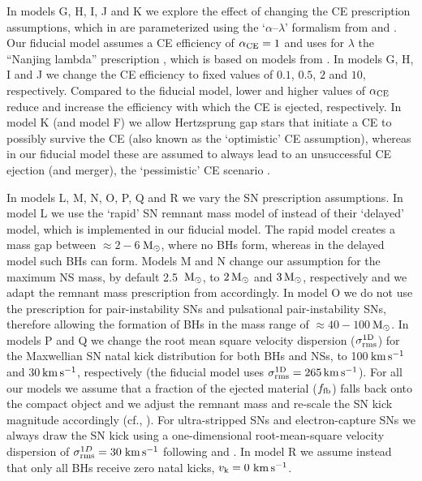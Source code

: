 \documentclass[fleqn,usenatbib]{mnras}
\newcommand\COMPAS{{\sc{COMPAS }}}
\newcommand{\vk}{\ensuremath{v_{\rm{k}}}\xspace}
\newcommand{\sigmacc}{\ensuremath{\sigma_{\rm{rms}}^{\rm{1D}}\xspace}}
\newcommand{\kms}{\ensuremath{\,\rm{km}\,\rm{s}^{-1}}\xspace}
\newcommand{\Msun}{\ensuremath{\,\rm{M}_{\odot}}\xspace}
\begin{document}
In models G, H, I, J and K we explore the effect of changing the \ac{CE} prescription assumptions, which in \COMPAS are parameterized using the `$\alpha$--$\lambda$' formalism from \citet{1984ApJ...277..355W} and \citet{1990ApJ...358..189D}. Our fiducial model assumes a \ac{CE} efficiency of $\alpha_{\rm{CE}}=1$ and uses for $\lambda$ the ``Nanjing lambda'' prescription   \citep[cf.,][]{2012ApJ...759...52D}, which is based on models from \citet{2010ApJ...716..114X,2010ApJ...722.1985X}. In models G, H, I  and J we change the \ac{CE} efficiency to fixed values of $0.1$,  $0.5$, $2$ and $10$, respectively.  Compared to the fiducial model, lower and higher values of $\alpha_{\rm{CE}}$ reduce and increase the efficiency with which the \ac{CE} is ejected, respectively.  In model K (and model F) we allow Hertzsprung gap stars that initiate a \ac{CE} to possibly survive the \ac{CE} (also known as the `optimistic' \ac{CE} assumption), whereas in our fiducial model these are assumed to always lead to an unsuccessful \ac{CE} ejection (and merger), the `pessimistic' \ac{CE} scenario \citep[cf.,][]{2012ApJ...759...52D}. 

In models L, M, N, O, P, Q and R we vary the \ac{SN} prescription assumptions. In model L we use the `rapid' \ac{SN} remnant mass model of \citet{2012ApJ...749...91F} instead of their `delayed' model, which is implemented in our fiducial model. The rapid model creates a mass gap between $\approx2-6$\Msun, where no \acp{BH} form, whereas in the delayed model such \acp{BH} can form. Models M and N change our assumption for the maximum \ac{NS} mass, by default 2.5 \Msun, to $2\Msun$ and $3\Msun$, respectively and we adapt the remnant mass prescription from \citet{2012ApJ...749...91F} accordingly. In model O we do not use the prescription for pair-instability \acp{SN} and pulsational pair-instability \acp{SN}, therefore allowing the formation of \acp{BH} in the mass range of  $\approx 40{-}100$\Msun. In models P and Q we change the root mean square velocity dispersion (\sigmacc) for the Maxwellian \ac{SN} natal kick distribution for both \acp{BH} and \acp{NS}, to 100\kms and 30\kms, respectively (the fiducial model uses  $\sigmacc=265\kms$). For all our models we assume that a fraction of the ejected material ($f_{\rm{fb}}$) falls back onto the compact object and we adjust the remnant mass and re-scale the \ac{SN} kick magnitude accordingly (cf., \citealt{2012ApJ...749...91F}). For ultra-stripped \acp{SN} and electron-capture \acp{SN} we always draw the \ac{SN} kick using a one-dimensional root-mean-square velocity dispersion of  $\sigma_{\rm{rms}}^{1D} = 30$\kms  following \citet{2002ApJ...571L..37P} and \citet{2004ApJ...612.1044P}. In model R we assume instead that only all \acp{BH} receive zero natal kicks, $\vk=0$\kms. 
\end{document}
